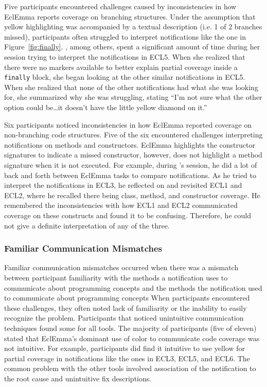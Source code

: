 Five participants encountered challenges caused by inconsistencies in how EclEmma reports coverage on branching structures. Under the assumption that yellow highlighting was accompanied by a textual description (i.e. 1 of 2 branches missed), participants often struggled to interpret notifications like the one in Figure~\ref{fig:finally}. , among others, spent a significant amount of time during her session trying to interpret the notifications in ECL5. When she realized that there were no markers available to better explain partial coverage inside a \texttt{finally} block, she began looking at the other similar notifications in ECL5. When she realized that none of the other notifications had what she was looking for, she summarized why she was struggling, stating ``I'm not sure what the other option could be\ldots it doesn't have the little yellow diamond on it.''

Six participants noticed inconsistencies in how EclEmma reported coverage on non-branching code structures. Five of the six encountered challenges interpreting notifications on methods and constructors. 
EclEmma highlights the constructor signatures to indicate a missed constructor, however, does not highlight a method signature when it is not executed. 
For example, during 's session, he did a lot of back and forth between EclEmma tasks to compare notifications. As he tried to interpret the notifications in ECL3, he reflected on and revisited ECL1 and ECL2, where he recalled there being class, method, and constructor coverage. He remembered the inconsistencies with how ECL1 and ECL2 communicated coverage on these constructs and found it to be confusing. Therefore, he could not give a definite interpretation of any of the three. 

\subsubsection{Familiar Communication Mismatches}\label{subsec:intuitive}
Familiar communication mismatches occurred when there was a mismatch between participant familiarity with the methods a notification uses to communicate about programming concepts and the methods the notification used to communicate about programming concepts When participants encountered these challenges, they often noted lack of familiarity or the inability to easily recognize the problem.
Participants that noticed unintuitive communication techniques found some for all tools. The majority of participants (five of eleven) stated that EclEmma's dominant use of color to communicate code coverage was not intuitive. For example, participants did find it intuitive to use yellow for partial coverage in notifications like the ones in ECL3, ECL5, and ECL6. 
The common problem with the other tools involved association of the notification to the root cause and unintuitive fix descriptions.

